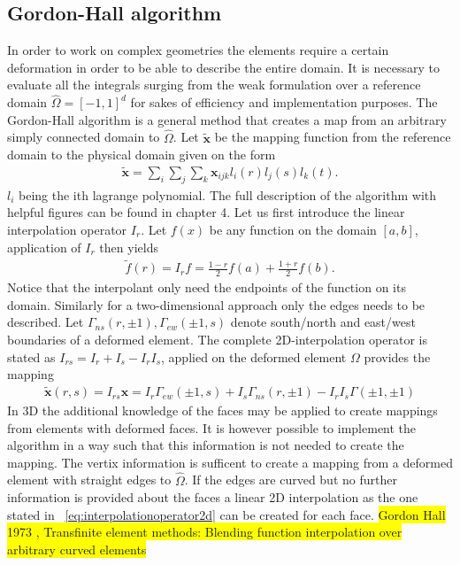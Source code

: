 \subsection{Gordon-Hall algorithm}
In order to work on complex geometries the elements require a certain deformation in order to be able 
to describe the entire domain. It is necessary to evaluate all the integrals surging from the weak formulation over 
a reference domain $\hat{\Omega} = [-1,1]^d$ for sakes of efficiency and implementation purposes. The Gordon-Hall 
algorithm is a general method that creates a map from an arbitrary simply connected domain to $\hat{\Omega}$.
Let $\mathbf{\tilde{x}}$ be the mapping function from the reference domain to the physical domain given on the form 
%
\begin{align}
    \mathbf{\tilde{x}}= \sum_i \sum_j \sum_k \mathbf{x}_{ijk}l_i(r) l_j(s) l_k(t).
    \label{eq:mapping}
\end{align}
%
$l_i$ being the ith lagrange polynomial.
The full description of the algorithm with helpful figures can be found in \cite{Deville} chapter 4.
Let us first introduce the linear interpolation operator $I_r$. Let $f(x)$ be any function on the domain $[a,b]$, 
application of $I_r$ then yields 
\begin{align}
    \tilde{f}(r) = I_rf = \frac{1-r}{2}f(a) + \frac{1+r}{2}f(b).
    \label{eq:interpolationoperator}
\end{align}
Notice that the interpolant only need the endpoints of the function on its domain.
Similarly for a two-dimensional approach only the edges needs to be described. 
Let $\Gamma_{ns}(r,\pm 1), \Gamma_{ew}(\pm 1,s) $ denote south/north and east/west boundaries of a deformed element.
The complete 2D-interpolation operator is stated as $I_{rs} = I_r+I_s-I_rI_s$,
applied on the deformed element $\Omega$ provides the mapping
%
\begin{align}
    \mathbf{\tilde{x}}(r,s) = 
    I_{rs}\mathbf{x} = 
    I_r\Gamma_{ew}(\pm 1,s)+I_s\Gamma_{ns}(r,\pm 1)-I_rI_s\Gamma(\pm 1,\pm 1)
    \label{eq:interpolationoperator2d}
\end{align}
%
In 3D the additional knowledge of the faces may be applied to create mappings from elements with deformed faces.
It is however possible to implement the algorithm in a way such that this information is not needed to create the mapping.
The vertix information is sufficent to create a mapping from a deformed element
with straight edges to $\hat{\Omega}$. If the edges are curved but no further information is provided about the faces 
a linear 2D interpolation as the one stated in ~\ref{eq:interpolationoperator2d} can be created for each face. 
\colorbox{yellow}{Gordon Hall 1973 , Transfinite element methods: Blending function interpolation over arbitrary curved elements}

